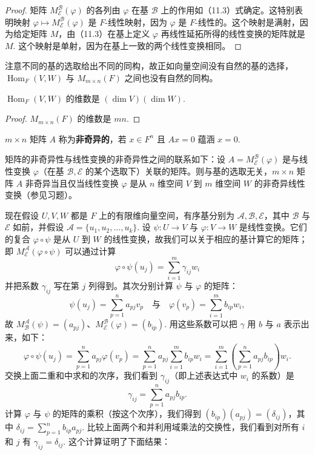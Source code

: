 \begin{proof}
矩阵 \(M_{\mathcal{E}}^{\mathcal{B}}(\varphi)\) 的各列由 \(\varphi\) 在基 \(\mathcal{B}\) 上的作用如（11.3）式确定。这特别表明映射 \(\varphi \mapsto M_{\mathcal{E}}^{\mathcal{B}}(\varphi)\) 是 \(F\)-线性映射，因为 \(\varphi\) 是 \(F\)-线性的。这个映射是满射，因为给定矩阵 \(M\)，由（11.3）在基上定义 \(\varphi\) 再线性延拓所得的线性变换的矩阵就是 \(M\). 这个映射是单射，因为在基上一致的两个线性变换相同。
\end{proof}

注意不同的基的选取给出不同的同构，故正如向量空间没有自然的基的选择，\(\operatorname{Hom}_F(V, W)\) 与 \(M_{m \times n}(F)\) 之间也没有自然的同构。

\begin{corollary}\label{cor:11.11}
\(\operatorname{Hom}_F(V, W)\) 的维数是 \((\dim V)(\dim W)\).
\end{corollary}

\begin{proof}
\(M_{m \times n}(F)\) 的维数是 \(mn\).
\end{proof}

\begin{definition}
\(m \times n\) 矩阵 \(A\) 称为\textbf{非奇异的}，若 \(x \in F^n\) 且 \(Ax = 0\) 蕴涵 \(x = 0\).
\end{definition}

矩阵的非奇异性与线性变换的非奇异性之间的联系如下：设 \(A = M_{\mathcal{E}}^{\mathcal{B}}(\varphi)\) 是与线性变换 \(\varphi\)（在基 \(\mathcal{B}, \mathcal{E}\) 的某个选取下）关联的矩阵。则与基的选取无关，\(m \times n\) 矩阵 \(A\) 非奇异当且仅当线性变换 \(\varphi\) 是从 \(n\) 维空间 \(V\) 到 \(m\) 维空间 \(W\) 的非奇异线性变换（参见习题）。

现在假设 \(U, V, W\) 都是 \(F\) 上的有限维向量空间，有序基分别为 \(\mathcal{A}, \mathcal{B}, \mathcal{E}\)，其中 \(\mathcal{B}\) 与 \(\mathcal{E}\) 如前，并假设 \(\mathcal{A} = \{u_1, u_2, \ldots, u_k\}\). 设 \(\psi : U \to V\) 与 \(\varphi : V \to W\) 是线性变换。它们的复合 \(\varphi \circ \psi\) 是从 \(U\) 到 \(W\) 的线性变换，故我们可以关于相应的基计算它的矩阵；即 \(M_{\mathcal{E}}^{\mathcal{A}}(\varphi \circ \psi)\) 可以通过计算
\[
\varphi \circ \psi(u_j) = \sum_{i=1}^m \gamma_{ij}w_i
\]
并把系数 \(\gamma_{ij}\) 写在第 \(j\) 列得到。其次分别计算 \(\psi\) 与 \(\varphi\) 的矩阵：
\[
\psi(u_j) = \sum_{p=1}^n a_{pj}v_p \quad \text{与} \quad \varphi(v_p) = \sum_{i=1}^m b_{ip}w_i,
\]
故 \(M_{\mathcal{B}}^{\mathcal{A}}(\psi) = (a_{pj})\)、\(M_{\mathcal{E}}^{\mathcal{B}}(\varphi) = (b_{ip})\). 用这些系数可以把 \(\gamma\) 用 \(b\) 与 \(a\) 表示出来，如下：
\[
\varphi \circ \psi(u_j) = \sum_{p=1}^n a_{pj}\varphi(v_p) = \sum_{p=1}^n a_{pj}\sum_{i=1}^m b_{ip}w_i = \sum_{i=1}^m\left(\sum_{p=1}^n a_{pj}b_{ip}\right)w_i.
\]
交换上面二重和中求和的次序，我们看到 \(\gamma_{ij}\)（即上述表达式中 \(w_i\) 的系数）是
\[
\gamma_{ij} = \sum_{p=1}^n a_{pj}b_{ip}.
\]
计算 \(\varphi\) 与 \(\psi\) 的矩阵的乘积（按这个次序），我们得到 \((b_{ip})(a_{pj}) = (\delta_{ij})\)，其中 \(\delta_{ij} = \sum_{p=1}^n b_{ip}a_{pj}\). 比较上面两个和并利用域乘法的交换性，我们看到对所有 \(i\) 和 \(j\) 有 \(\gamma_{ij} = \delta_{ij}\). 这个计算证明了下面结果：

